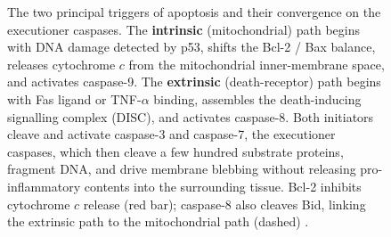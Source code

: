 \begin{figure}[htbp]
\caption[The apoptotic caspase cascade]{The two principal triggers
of apoptosis and their convergence on the executioner caspases. The
\textbf{intrinsic} (mitochondrial) path begins with DNA damage
detected by p53, shifts the Bcl-2 / Bax balance, releases cytochrome
$c$ from the mitochondrial inner-membrane space, and activates
caspase-9. The \textbf{extrinsic} (death-receptor) path begins with
Fas ligand or TNF-$\alpha$ binding, assembles the death-inducing
signalling complex (DISC), and activates caspase-8. Both initiators
cleave and activate caspase-3 and caspase-7, the executioner caspases,
which then cleave a few hundred substrate proteins, fragment DNA, and
drive membrane blebbing without releasing pro-inflammatory contents
into the surrounding tissue. Bcl-2 inhibits cytochrome $c$ release
(red bar); caspase-8 also cleaves Bid, linking the extrinsic path to
the mitochondrial path (dashed) \cite{paper:v6c01-vaux-korsmeyer-1999,
paper:v6c01-galluzzi-2018}.}
\label{fig:vol06:ch01:apoptosis-cascade}
\end{figure}
